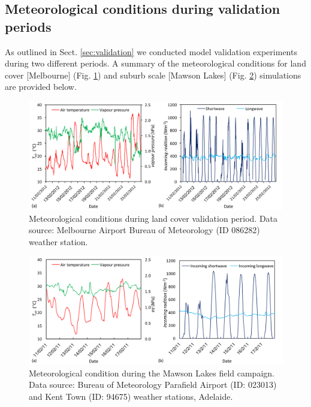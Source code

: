 \documentclass[gmd, manuscript]{copernicus}
\begin{document}
\subsection{Meteorological conditions during validation periods}

As outlined in Sect. \ref{sec:validation} we conducted model validation experiments during two different periods. A summary of the meteorological conditions for  land cover [Melbourne] (Fig. \ref{fig:met}) and suburb scale [Mawson Lakes] (Fig. \ref{fig:met3}) simulations are provided below.

\begin{figure}[!htbp]

\includegraphics[width=1\textwidth,keepaspectratio]{figure11.png}

 \caption{Meteorological conditions during land cover validation period. Data source: Melbourne Airport Bureau of Meteorology (ID 086282) weather station.} \label{fig:met}
\end{figure}

\begin{figure}[!htbp]

\includegraphics[width=1\textwidth,keepaspectratio]{figure12.png}

 \caption{Meteorological condition during the Mawson Lakes field campaign. Data source: Bureau of Meteorology Parafield Airport (ID: 023013) and Kent Town (ID: 94675) weather stations, Adelaide.} \label{fig:met3}
\end{figure}
\end{document}
